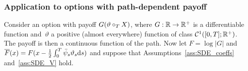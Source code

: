 
\subsubsection{\textbf{Application to options with path-dependent payoff}}
Consider an option with payoff $G(\vartheta \circ_{T} X)$, where $G:\mathbb{R} \rightarrow \mathbb{R}^{+}$ is a differentiable function and~$\vartheta$ a positive (almost everywhere) function of class $\mathcal{C}^1([0,T]; \mathbb{R}^{+})$. 
The payoff is then a continuous function of the path. Now let $F = \log|G|$ and $\overline{F}(x) = F(x-\frac{1}{2}\int_0^T\bar\psi_s\vartheta_s \mathrm{d} s)$ and suppose that Assumptions~\ref{ass:SDE_coeffs} and~\ref{ass:SDE_V} hold.


